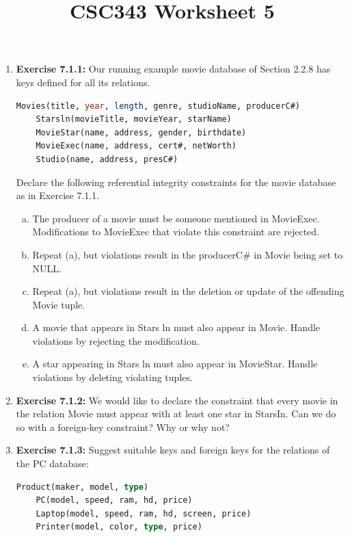 \documentclass[12pt]{article}
\begin{document}
\title{CSC343 Worksheet 5}
\maketitle

\begin{enumerate}[1.]
    \item \textbf{Exercise 7.1.1:} Our running example movie database of Section
    2.2.8 has keys defined for all its relations.

    \begin{lstlisting}[language=SQL]
    Movies(title, year, length, genre, studioName, producerC#)
    Starsln(movieTitle, movieYear, starName)
    MovieStar(name, address, gender, birthdate)
    MovieExec(name, address, cert#, netWorth)
    Studio(name, address, presC#)
    \end{lstlisting}

    \bigskip

    Declare the following referential integrity constraints for the movie database as
    in Exercise 7.1.1.

    \begin{enumerate}[a)]
        \item The producer of a movie must be someone mentioned in MovieExec. Modifications to MovieExec that violate this constraint are rejected.
        \item Repeat (a), but violations result in the producerC\# in Movie being set to NULL.
        \item Repeat (a), but violations result in the deletion or update of the offending Movie tuple.
        \item A movie that appears in Stars ln must also appear in Movie. Handle violations by rejecting the modification.
        \item A star appearing in Stars ln must also appear in MovieStar. Handle violations by deleting violating tuples.
    \end{enumerate}

    \item \textbf{Exercise 7.1.2:} We would like to declare the constraint that every movie in
    the relation Movie must appear with at least one star in StarsIn. Can we do
    so with a foreign-key constraint? Why or why not?

    \item \textbf{Exercise 7.1.3:} Suggest suitable keys and foreign keys for the relations of the
    PC database:

    \begin{lstlisting}[language=SQL]
    Product(maker, model, type)
    PC(model, speed, ram, hd, price)
    Laptop(model, speed, ram, hd, screen, price)
    Printer(model, color, type, price)
    \end{lstlisting}


\end{enumerate}
\end{document}
